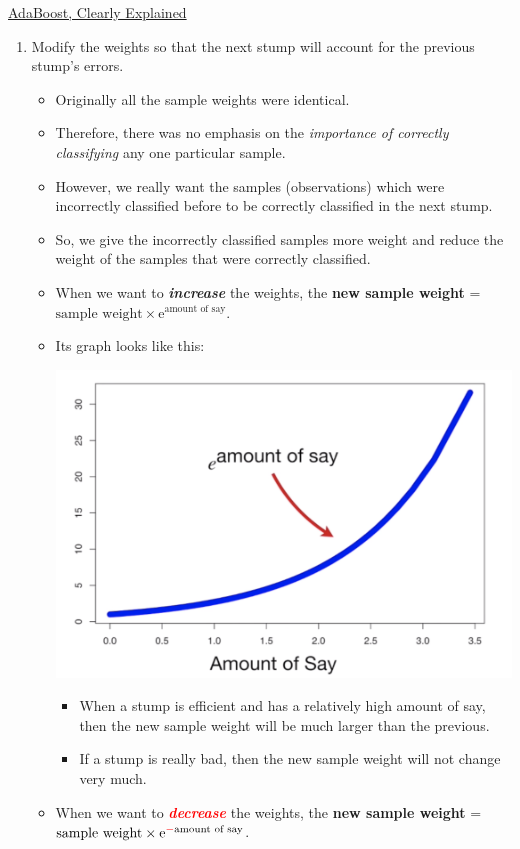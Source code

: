 \documentclass[12pt, titlepage, french]{report}
\begin{document}
\begin{YTB_SUMM_AUTO_NUMB}[label = {SQ-Boo-Ada}]{\href{https://www.youtube.com/watch?v=LsK-xG1cLYA&feature=youtu.be}{AdaBoost, Clearly Explained}}
\begin{enumerate}[leftmargin = *]
\item	Modify the weights so that the next stump will account for the previous stump's errors.
\begin{itemize}[leftmargin = *]
	\item	Originally all the sample weights were identical.
	\item[]	Therefore, there was no emphasis on the \textit{importance of correctly classifying} any one particular sample.
	\item[]	However, we really want the samples (observations) which were incorrectly classified before to be correctly classified in the next stump. 
	\item[]	So, we give the incorrectly classified samples more weight and reduce the weight of the samples that were correctly classified.
	\item	When we want to \textit{\textbf{increase}} the weights, the \textbf{new sample weight} = $\text{sample weight} \times \textrm{e}^{\text{amount of say}}$.
	\item[]	Its graph looks like this:
	\begin{center}
		\includegraphics[scale=0.4]{src/SQ-ADA-NEW-SWE.png}
	\end{center}
		\begin{itemize}[leftmargin = *]
		\item	When a stump is efficient and has a relatively high amount of say, then the new sample weight will be much larger than the previous.
		\item	If a stump is really bad, then the new sample weight will not change very much.
		\end{itemize}
	\item	When we want to \textit{\textbf{\textcolor{red}{decrease}}} the weights, the \textbf{new sample weight} = $\text{sample weight} \times \textrm{e}^{\textcolor{red}{-}\text{amount of say}}$.

\end{itemize}
\end{enumerate}
\end{YTB_SUMM_AUTO_NUMB}
\end{document}

